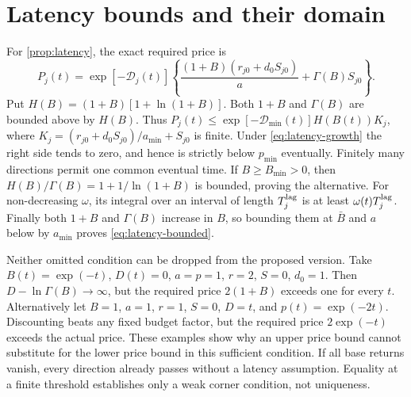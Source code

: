 \section{Latency bounds and their domain}
\label{app:latency-proof}
For \cref{prop:latency}, the exact required price is
\[
 P_j(t)=\exp[-\mathcal D_j(t)]\left\{
 \frac{(1+B)(r_{j0}+d_0S_{j0})}{a}+\Gamma(B)S_{j0}\right\}.
\]
Put $H(B)=(1+B)[1+\ln(1+B)]$. Both $1+B$ and $\Gamma(B)$ are bounded
above by $H(B)$. Thus
$P_j(t)\leq\exp[-\mathcal D_{\min}(t)]H(B(t))K_j$, where
$K_j=(r_{j0}+d_0S_{j0})/a_{\min}+S_{j0}$ is finite. Under
\cref{eq:latency-growth} the right side tends to zero, and hence is
strictly below $p_{\min}$ eventually. Finitely many directions permit
one common eventual time. If $B\geq B_{\min}>0$, then
$H(B)/\Gamma(B)=1+1/\ln(1+B)$ is bounded, proving the alternative.
For non-decreasing $\omega$, its integral over an interval of length
$T_j^{\rm lag}$ is at least $\omega(t)T_j^{\rm lag}$. Finally both
$1+B$ and $\Gamma(B)$ increase in $B$, so bounding them at $\bar B$
and $a$ below by $a_{\min}$ proves \cref{eq:latency-bounded}.

Neither omitted condition can be dropped from the proposed version.
Take $B(t)=\exp(-t)$, $D(t)=0$, $a=p=1$, $r=2$, $S=0$, $d_0=1$.
Then $D-\ln\Gamma(B)\to\infty$, but the required price
$2(1+B)$ exceeds one for every $t$. Alternatively let $B=1$, $a=1$,
$r=1$, $S=0$, $D=t$, and $p(t)=\exp(-2t)$. Discounting beats any
fixed budget factor, but the required price $2\exp(-t)$ exceeds the
actual price. These examples show why an upper price bound cannot
substitute for the lower price bound in this sufficient condition.
If all base returns vanish, every direction already passes without a
latency assumption. Equality at a finite threshold establishes only a
weak corner condition, not uniqueness.
